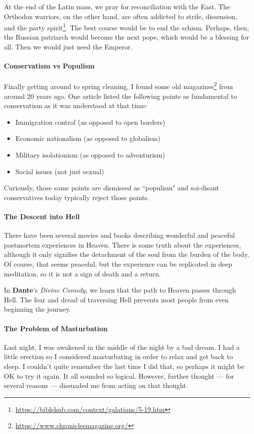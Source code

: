 At the end of the Latin mass, we pray for reconciliation with the East. The Orthodox warriors, on the other hand, are often addicted to strife, dissension, and the party spirit\footnote{\url{https://biblehub.com/context/galatians/5-19.htm}}. The best course would be to end the schism. Perhaps, then, the Russian patriarch would become the next pope, which would be a blessing for all. Then we would just need the Emperor.

\paragraph{Conservatism vs Populism}
Finally getting around to spring cleaning, I found some old magazines\footnote{\url{https://www.chroniclesmagazine.org/}} from around 20 years ago. One article listed the following points as fundamental to conservatism as it was understood at that time:

\begin{itemize}
\item Immigration control (as opposed to open borders) 
\item Economic nationalism (as opposed to globalism) 
\item Military isolationism (as opposed to adventurism) 
\item Social issues (not just sexual) 
\end{itemize}
Curiously, those same points are dismissed as ``populism" and soi-disant conservatives today typically reject those points.

\paragraph{The Descent into Hell}
There have been several movies and books describing wonderful and peaceful postmortem experiences in Heaven. There is some truth about the experiences, although it only signifies the detachment of the soul from the burden of the body. Of course, that seems peaceful, but the experience can be replicated in deep meditation, so it is not a sign of death and a return.

In \textbf{Dante}'s \emph{Divine Comedy}, we learn that the path to Heaven passes through Hell. The fear and dread of traversing Hell prevents most people from even beginning the journey.

\paragraph{The Problem of Masturbation}
Last night, I was awakened in the middle of the night by a bad dream. I had a little erection so I considered masturbating in order to relax and get back to sleep. I couldn't quite remember the last time I did that, so perhaps it might be OK to try it again. It all sounded so logical. However, further thought — for several reasons — dissuaded me from acting on that thought.

